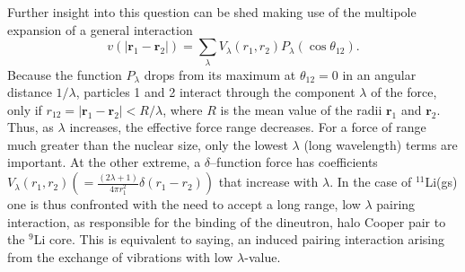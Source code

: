  Further insight into this question can be shed making use of the multipole expansion of a general interaction
\begin{equation}
v(|\mathbf{r}_1-\mathbf r_2|)=\sum_{\lambda}V_{\lambda}(r_1,r_2)P_\lambda(\cos\theta_{12}).
\end{equation}
Because the function $P_\lambda$ drops from its maximum at $\theta_{12}=0$ in an angular distance $1/\lambda$, particles 1 and 2 interact through the component $\lambda$ of the force, only if $r_{12}=|\mathbf{r}_1-\mathbf{r}_2|<R/\lambda$, where $R$ is the mean value of the radii $\mathbf{r}_1$ and $\mathbf{r}_2$. Thus, as $\lambda$ increases, the effective force range decreases. For a force of range much greater than the nuclear size, only the lowest $\lambda$ (long wavelength) terms are important. At the other extreme, a $\delta$--function force has coefficients $V_\lambda(r_1,r_2)\left(=\tfrac{(2\lambda+1)}{4\pi r_1^2}\delta(r_1-r_2)\right)$ that increase with $\lambda$. In the case of $^{11}$Li(gs) one is thus confronted with the need to accept  a long range, low $\lambda$ pairing interaction, as responsible for the binding of the dineutron, halo Cooper pair to the $^9$Li core. This is equivalent to saying, an induced pairing interaction arising from the exchange of vibrations with low $\lambda$-value.
